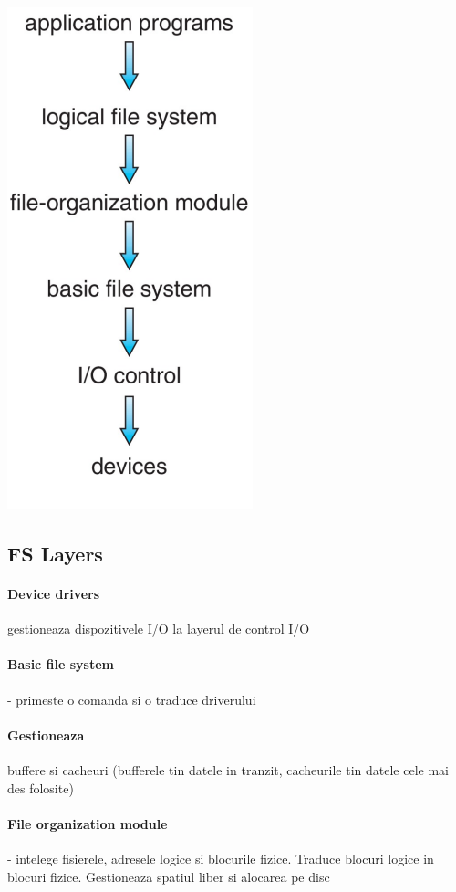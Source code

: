 \documentclass{article}
\begin{document}
\begin{center}
    \includegraphics[scale=0.4]{47-layeredfs.png}
\end{center}

\subsection*{FS Layers}
\paragraph*{Device drivers} gestioneaza dispozitivele I/O la layerul de control I/O
\paragraph*{Basic file system} - primeste o comanda si o traduce driverului
\paragraph*{Gestioneaza} buffere si cacheuri (bufferele tin datele in tranzit, cacheurile tin datele cele mai des folosite)
\paragraph*{File organization module} - intelege fisierele, adresele logice si blocurile fizice. Traduce blocuri logice in blocuri fizice. Gestioneaza spatiul liber si alocarea pe disc
\end{document}
